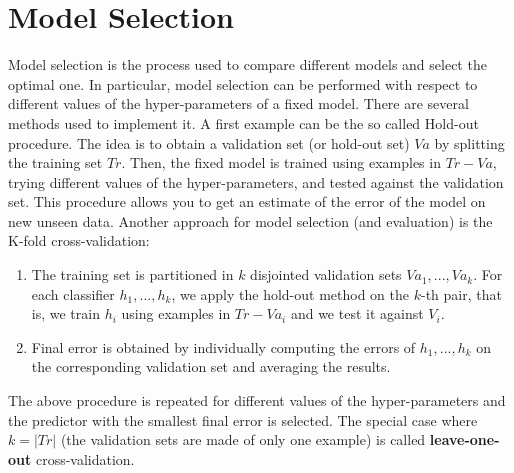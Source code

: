 \section{Model Selection}
Model selection is the process used to compare different models and select the optimal one. In particular, model selection can be performed with respect to different values of the hyper-parameters of a fixed model.\newline\newline
There are several methods used to implement it. A first example can be the so called Hold-out procedure. The idea is to obtain a validation set (or hold-out set) $Va$ by splitting the training set $Tr$. Then, the fixed model is trained using examples in $Tr - Va$, trying different values of the hyper-parameters, and tested against the validation set. This procedure allows you to get an estimate of the error of the model on new unseen data.\newline\newline
Another approach for model selection (and evaluation) is the K-fold cross-validation:
\begin{enumerate}
    \item The training set is partitioned in $k$ disjointed validation sets $Va_{1},...,Va_{k}$. For each classifier $h_{1},...,h_{k}$, we apply the hold-out method on the $k$-th pair, that is, we train $h_{i}$ using examples in $Tr - Va_{i}$ and we test it against $V_{i}$. 

    \item Final error is obtained by individually computing the errors of $h_{1},...,h_{k}$ on the corresponding validation set and averaging the results.
\end{enumerate}
The above procedure is repeated for different values of the hyper-parameters and the predictor with the smallest final error is selected. The special case where $k = |Tr|$ (the validation sets are made of only one example) is called \textbf{leave-one-out} cross-validation.\newline\newline


